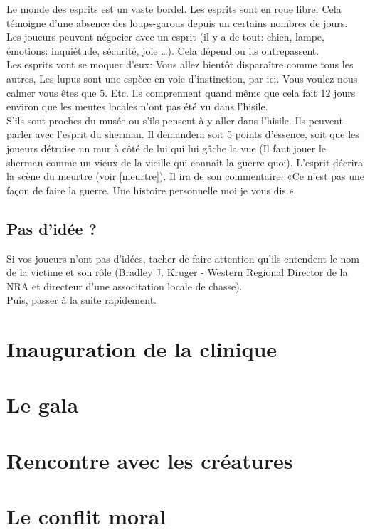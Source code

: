 \documentclass[oneside,12pt]{book}
\begin{document}
\begin{flushleft}
Le monde des esprits est un vaste bordel. Les esprits sont en roue libre. Cela témoigne d’une absence des loups-garous depuis un certains nombres de jours.\\
Les joueurs peuvent négocier avec un esprit (il y a de tout: chien, lampe, émotions: inquiétude, sécurité, joie …). Cela dépend ou ils outrepassent.\\
Les esprits vont se moquer d’eux: Vous allez bientôt disparaître comme tous les autres, Les lupus sont une espèce en voie d’instinction, par ici. Vous voulez nous calmer vous êtes que 5. Etc.
Ils comprennent quand même que cela fait 12 jours environ que les meutes locales n’ont pas été vu dans l’hisile.\\
S’ils sont proches du musée ou s’ils pensent à y aller dans l’hisile. Ils peuvent parler avec l’esprit du sherman. Il demandera soit 5 points d’essence, soit que les joueurs détruise un mur à côté de lui qui lui gâche la vue (Il faut jouer le sherman comme un vieux de la vieille qui connaît la guerre quoi). L’esprit décrira la scène du meurtre (voir \ref{meurtre}). Il ira de son commentaire: «Ce n’est pas une façon de faire la guerre. Une histoire personnelle moi je vous dis.».\\


\subsection{Pas d’idée ?}
Si vos joueurs n’ont pas d’idées, tacher de faire attention qu’ils entendent le nom de la victime et son rôle (Bradley J. Kruger - Western Regional Director de la NRA et directeur d’une associtation locale de chasse).\\
Puis, passer à la suite rapidement.


\section{Inauguration de la clinique}

\section{Le gala}


\section{Rencontre avec les créatures}


\section{Le conflit moral}




\end{flushleft}
\end{document}
